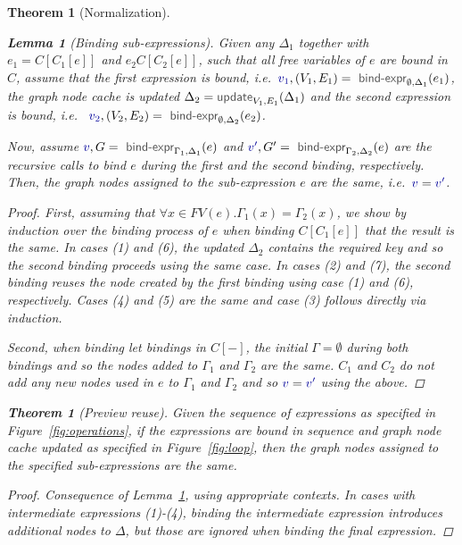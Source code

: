 \documentclass[acmsmall,anonymous,fleqn]{acmart}\settopmatter{printfolios=false,printccs=false,printacmref=false}
\newcounter{thc}
\theoremstyle{plain}
\newtheorem{lem}[thc]{Lemma}
\newtheorem{theorem}[thc]{Theorem}
\theoremstyle{definition}
\newcommand{\ident}[1]{\textnormal{\textcolor{idclr}{\sffamily #1}}}
\newcommand{\bndclr}[1]{\textcolor{kvdclr}{#1}}
\begin{document}
\begin{theorem}[Normalization]
\begin{lem}[Binding sub-expressions]
\label{thm:sub-expr}
Given any $\Delta_1$ together with $e_1 = C[C_1[e]]$ and $e_2 C[C_2[e]]$, such that all free
variables of $e$ are bound in $C$, assume that the first expression is bound,
i.e.~$\bndclr{v_1}, (V_1, E_1) = \ident{bind-expr}_{\emptyset, \Delta_1}(e_1)$, the graph node cache
is updated $\Delta_2 = \ident{update}_{V_1, E_1}(\Delta_1)$ and the second expression is bound, i.e.~
$\bndclr{v_2}, (V_2, E_2) = \ident{bind-expr}_{\emptyset, \Delta_2}(e_2)$.

Now, assume $\bndclr{v}, G = \ident{bind-expr}_{\Gamma_1, \Delta_1}(e)$ and
$\bndclr{v'}, G' = \ident{bind-expr}_{\Gamma_2, \Delta_2}(e)$ are the recursive calls to bind
$e$ during the first and the second binding, respectively. Then, the graph nodes assigned to the
sub-expression $e$ are the same, i.e.~$\bndclr{v} = \bndclr{v'}$.
\end{lem}
\begin{proof}
First, assuming that $\forall x\in FV(e). \Gamma_1(x) = \Gamma_2(x)$, we show by induction over the binding process of $e$
when binding $C[C_1[e]]$ that the result is the same. In cases (1) and (6), the updated $\Delta_2$
contains the required key and so the second binding proceeds using the same case. In cases
(2) and (7), the second binding reuses the node created by the first binding using case (1) and
(6), respectively. Cases (4) and (5) are the same and case (3) follows directly via induction.

Second, when binding let bindings in $C[-]$, the initial $\Gamma = \emptyset$ during both bindings
and so the nodes added to $\Gamma_1$ and $\Gamma_2$ are the same. $C_1$ and $C_2$ do not add
any new nodes used in $e$ to $\Gamma_1$ and $\Gamma_2$ and so $\bndclr{v} = \bndclr{v'}$
using the above.
\end{proof}

\begin{theorem}[Preview reuse]
Given the sequence of expressions as specified in Figure~\ref{fig:operations}, if the expressions
are bound in sequence and graph node cache updated as specified in Figure~\ref{fig:loop}, then
the graph nodes assigned to the specified sub-expressions are the same.
\end{theorem}
\begin{proof}
Consequence of Lemma~\ref{thm:sub-expr}, using appropriate contexts. In cases with
intermediate expressions (1)-(4), binding the intermediate expression introduces additional
nodes to $\Delta$, but those are ignored when binding the final expression.
\end{proof}


\end{theorem}
\end{document}
